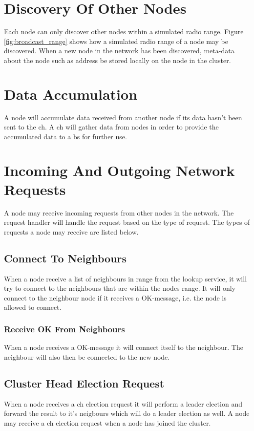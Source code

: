 \documentclass[USenglish]{uit-thesis}
\begin{document}


\section{Discovery Of Other Nodes} \label{sec:discON}
Each node can only discover other nodes within a simulated radio range. Figure \ref{fig:broadcast_range} shows how a simulated radio range of a node may be discovered. When a new node in the network has been discovered, meta-data about the node such as address be stored locally on the node in the cluster.


\section{Data Accumulation}
A node will accumulate data received from another node if its data hasn't been sent to the \gls{ch}. A \gls{ch} will gather data from nodes in order to provide the accumulated data to a \gls{bs} for further use.


\section{Incoming And Outgoing Network Requests}
A node may receive incoming requests from other nodes in the network. The request handler will handle the request based on the type of request. The types of requests a node may receive are listed below.

\subsection{Connect To Neighbours}
When a node receive a list of neighbours in range from the lookup service, it will try to connect to the neighbours that are within the nodes range. It will only connect to the neighbour node if it receives a OK-message, i.e. the node is allowed to connect.

\subsubsection{Receive OK From Neighbours}
When a node receives a OK-message it will connect itself to the neighbour. The neighbour will also then be connected to the new node.

\subsection{Cluster Head Election Request}
When a node receives a \gls{ch} election request it will perform a leader election and forward the result to it's neigbours which will do a leader election as well.
A node may receive a \gls{ch} election request when a node has joined the cluster.
\end{document}
